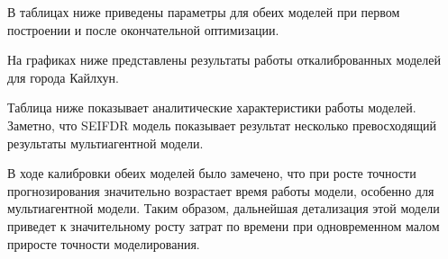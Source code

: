 В таблицах ниже приведены параметры для обеих моделей при первом построении и после окончательной оптимизации.


На графиках ниже представлены результаты работы откалиброванных моделей для города Кайлхун. 


Таблица ниже показывает аналитические характеристики работы моделей. Заметно, что SEIFDR  модель показывает результат несколько превосходящий результаты мультиагентной модели.

В ходе калибровки обеих моделей было замечено, что при росте точности прогнозирования значительно возрастает время работы модели, особенно для мультиагентной модели. Таким образом, дальнейшая детализация этой модели приведет к значительному росту затрат по времени при одновременном малом приросте точности моделирования. 



